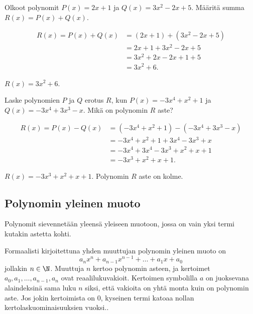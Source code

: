 \begin{esimerkki}
    Olkoot polynomit $P(x)=2x+1$ ja $Q(x)=3x^2-2x+5$. Määritä summa $R(x)=P(x)+Q(x)$.
    \begin{esimratk}
        \begin{align*}
            R(x) = P(x)+Q(x) &= (2x+1)+(3x^2-2x+5) \\
                             &= 2x+1+3x^2-2x+5 \\
                             &= 3x^2+2x-2x+1+5 \\
                             &= 3x^2+6.
        \end{align*}
    \end{esimratk}
    \begin{esimvast}
        $R(x) = 3x^2+6$.
    \end{esimvast}
\end{esimerkki}

\begin{esimerkki}
    Laske polynomien $P$ ja $Q$ erotus $R$, kun $P(x)=-3x^4+x^2+1$ ja $Q(x)=-3x^4+3x^3-x$.
    Mikä on polynomin $R$ aste?
   \begin{esimratk}
        \begin{align*}
            R(x) = P(x)-Q(x) &= (-3x^4+x^2+1)-(-3x^4+3x^3-x) \\
                             &= -3x^4+x^2+1+3x^4-3x^3+x \\
                             &= -3x^4+3x^4-3x^3+x^2+x+1 \\
                             &= -3x^3+x^2+x+1.
        \end{align*}
    \end{esimratk}
    \begin{esimvast}
        $R(x) = -3x^3+x^2+x+1$. Polynomin $R$ aste on kolme.
    \end{esimvast}
\end{esimerkki}

\subsection*{Polynomin yleinen muoto}

Polynomit sievennetään yleensä yleiseen muotoon, jossa on vain yksi termi kutakin astetta kohti.

Formaalisti kirjoitettuna yhden muuttujan polynomin yleinen muoto on
\[a_n x^n + a_{n-1} x^{n-1} + \ldots + a_1 x + a_0 \] 
jollakin $n\in\N$. Muuttuja $n$ kertoo polynomin asteen, ja kertoimet $a_0, a_1, \ldots, a_{n-1}, a_n$ ovat reaalilukuvakioit. Kertoimen symbolilla $a$ on juoksevana alaindeksinä sama luku $n$ siksi, että vakioita on yhtä monta kuin on polynomin aste. Jos jokin kertoimista on $0$, kyseinen termi katoaa nollan kertolaskuominaisuuksien vuoksi..

